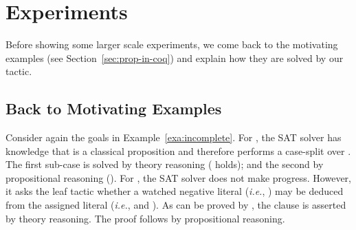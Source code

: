 \documentclass[utf8,a4paper,UKenglish,cleveref, autoref, thm-restate]{lipics-v2021}
\begin{document}

\section{Experiments}
\label{sec:experiments}

Before showing some larger scale experiments, we come back to the
motivating examples (see Section~\ref{sec:prop-in-coq}) and explain how
they are solved by our tactic.

\subsection{Back to Motivating Examples}

Consider again the goals in Example~\ref{exa:incomplete}.  For
, the SAT solver has knowledge that  is a classical
proposition and therefore performs a case-split over .
The first sub-case is solved by theory reasoning (
holds); and the second by propositional reasoning ().
%
For , the SAT solver does not make progress. However, it
asks the leaf tactic  whether a watched negative
literal (\emph{i.e.}, ) may be deduced from the assigned
literal (\emph{i.e.},  and ).
%
As  can be proved by ,
the clause is asserted by theory reasoning. The proof follows by
propositional reasoning.
\end{document}
